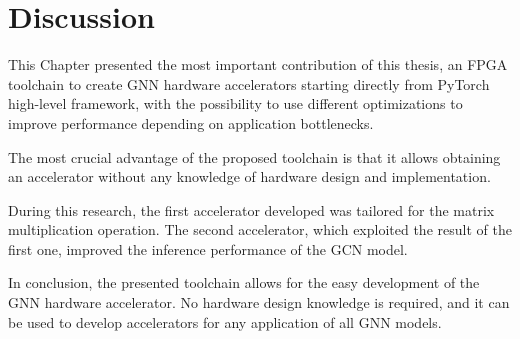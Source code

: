 \section{Discussion}
\label{sec:toolchain-discussion}%

This Chapter presented the most important contribution of this thesis, an FPGA toolchain to create GNN hardware accelerators starting directly from PyTorch high-level framework, with the possibility to use different optimizations to improve performance depending on application bottlenecks.

The most crucial advantage of the proposed toolchain is that it allows obtaining an accelerator without any knowledge of hardware design and implementation.

During this research, the first accelerator developed was tailored for the matrix multiplication operation.
The second accelerator, which exploited the result of the first one, improved the inference performance of the GCN model.

In conclusion, the presented toolchain allows for the easy development of the GNN hardware accelerator.
No hardware design knowledge is required, and it can be used to develop accelerators for any application of all GNN models.